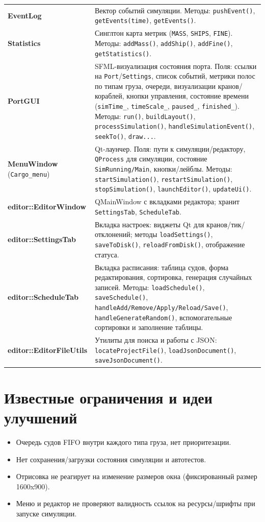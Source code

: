 \documentclass[12pt,a4paper]{article}
\begin{document}
\begin{longtable}{p{3.8cm}p{11cm}}
\textbf{EventLog} & Вектор событий симуляции. Методы: \texttt{pushEvent()}, \texttt{getEvents(time)}, \texttt{getEvents()}. \\
\textbf{Statistics} & Синглтон карта метрик (\texttt{MASS}, \texttt{SHIPS}, \texttt{FINE}). Методы: \texttt{addMass()}, \texttt{addShip()}, \texttt{addFine()}, \texttt{getStatistics()}. \\
\textbf{PortGUI} & SFML-визуализация состояния порта. Поля: ссылки на \texttt{Port}/\texttt{Settings}, список событий, метрики полос по типам груза, очереди, визуализации кранов/кораблей, кнопки управления, состояние времени (\texttt{simTime\_}, \texttt{timeScale\_}, \texttt{paused\_}, \texttt{finished\_}). Методы: \texttt{run()}, \texttt{buildLayout()}, \texttt{processSimulation()}, \texttt{handleSimulationEvent()}, \texttt{seekTo()}, \texttt{draw...}. \\
\textbf{MenuWindow} (\verb|Cargo_menu|) & Qt-лаунчер. Поля: пути к симуляции/редактору, \texttt{QProcess} для симуляции, состояние \texttt{SimRunning/Main}, кнопки/лейблы. Методы: \texttt{startSimulation()}, \texttt{restartSimulation()}, \texttt{stopSimulation()}, \texttt{launchEditor()}, \texttt{updateUi()}. \\
\textbf{editor::EditorWindow} & QMainWindow с вкладками редактора; хранит \texttt{SettingsTab}, \texttt{ScheduleTab}. \\
\textbf{editor::SettingsTab} & Вкладка настроек: виджеты Qt для кранов/тик/отклонений; методы \texttt{loadSettings()}, \texttt{saveToDisk()}, \texttt{reloadFromDisk()}, отображение статуса. \\
\textbf{editor::ScheduleTab} & Вкладка расписания: таблица судов, форма редактирования, сортировка, генерация случайных записей. Методы: \texttt{loadSchedule()}, \texttt{saveSchedule()}, \texttt{handleAdd/Remove/Apply/Reload/Save()}, \texttt{handleGenerateRandom()}, вспомогательные сортировки и заполнение таблицы. \\
\textbf{editor::EditorFileUtils} & Утилиты для поиска и работы с JSON: \texttt{locateProjectFile()}, \texttt{loadJsonDocument()}, \texttt{saveJsonDocument()}. \\
\end{longtable}

\section{Известные ограничения и идеи улучшений}
\begin{itemize}[noitemsep]
    \item Очередь судов FIFO внутри каждого типа груза, нет приоритезации.
    \item Нет сохранения/загрузки состояния симуляции и автотестов.
    \item Отрисовка не реагирует на изменение размеров окна (фиксированный размер 1600x900).
    \item Меню и редактор не проверяют валидность ссылок на ресурсы/шрифты при запуске симуляции.
\end{itemize}
\end{document}

